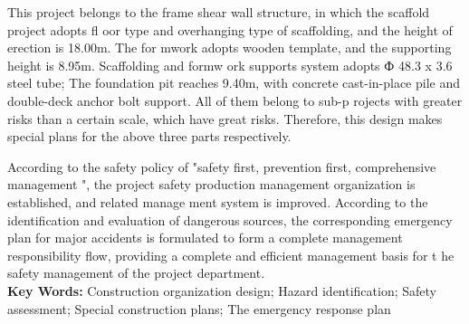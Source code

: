    This project belongs to the frame shear wall structure, in which the scaffold project adopts fl oor type and overhanging type of scaffolding, 
   and the height of erection is 18.00m. The for mwork adopts wooden template, and the supporting height is 8.95m. Scaffolding and formw ork 
   supports system adopts Ф 48.3 x 3.6 steel tube; The foundation pit reaches 9.40m, with concrete cast-in-place pile and double-deck anchor 
   bolt support. All of them belong to sub-p rojects with greater risks than a certain scale, which have great risks. Therefore, this design 
   makes special plans for the above three parts respectively.

   According to the safety policy of "safety first, prevention first, comprehensive management ", the project safety production management 
   organization is established, and related manage ment system is improved. According to the identification and evaluation of dangerous sources,
    the corresponding emergency plan for major accidents is formulated to form a complete management responsibility flow, providing a complete 
    and efficient management basis for t he safety management of the project department.
    \\

\textbf{ Key Words:} Construction organization design; Hazard identification; Safety assessment; Special construction plans; The emergency response plan





